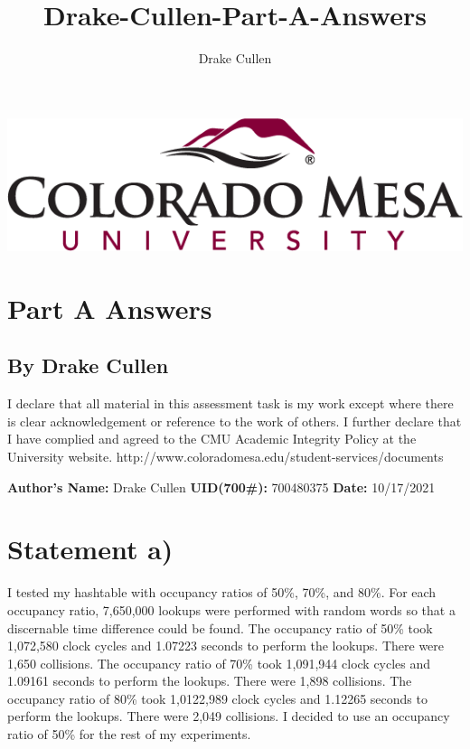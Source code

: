\documentclass[11pt]{article}
\title{Drake-Cullen-Part-A-Answers}
\author{Drake Cullen}
\begin{document}
\begin{minipage}{\linewidth}%
\centering
\includegraphics[keepaspectratio=true,scale=0.35]{CMU.png}
\end{minipage}
\section*{ \centering Part A Answers}
\subsection*{ \centering By Drake Cullen} 

\vspace{5mm}
 
I declare that all material in this assessment task is my work except where there is clear acknowledgement or reference to the work of others. I further declare that I have complied and agreed to the CMU Academic Integrity Policy at the University website. http://www.coloradomesa.edu/student-services/documents
\begin{center}
\textbf{Author’s Name:} Drake Cullen 
\textbf{UID(700\#):} 700480375
\textbf{ Date:} 10/17/2021
\end{center} 

\section*{Statement a)}
I tested my hashtable with occupancy ratios of 50\%, 70\%, and 80\%. For each occupancy ratio, 7,650,000 lookups were performed with random words so that a discernable time difference could be found. \newline The occupancy ratio of 50\% took 1,072,580 clock cycles and 1.07223 seconds to perform the lookups. There were 1,650 collisions. \newline The occupancy ratio of 70\% took 1,091,944 clock cycles and 1.09161 seconds to perform the lookups. There were 1,898 collisions. \newline The occupancy ratio of 80\% took 1,0122,989 clock cycles and 1.12265 seconds to perform the lookups. There were 2,049 collisions. \newline I decided to use an occupancy ratio of 50\% for the rest of my experiments.
\end{document}
